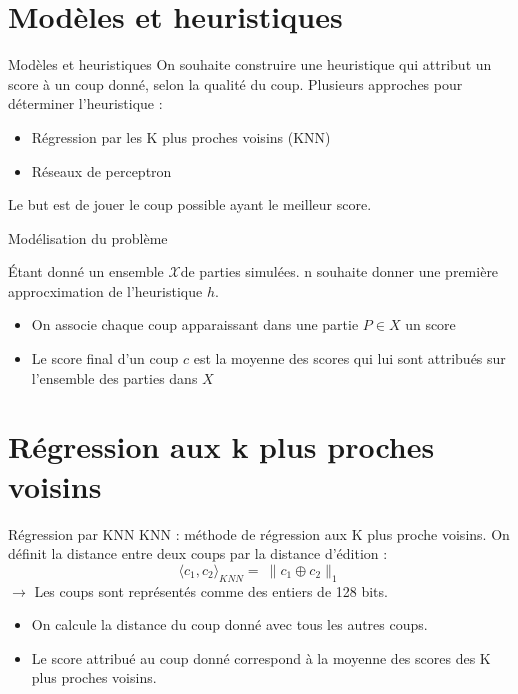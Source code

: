 \documentclass{beamer}
\begin{document}
{\section{Modèles et heuristiques}}
\begin{frame}{Modèles et heuristiques}
    On souhaite construire une heuristique qui attribut un \alert{score} à un coup donné, selon la \alert{qualité} du coup. 
    Plusieurs approches pour déterminer l'heuristique :
    \begin{itemize}
        \item Régression par les K plus proches voisins (KNN)
        \item Réseaux de perceptron
    \end{itemize}
    Le but est de jouer le coup possible ayant le meilleur score.
\end{frame}

\begin{frame}{Modélisation du problème}

    Étant donné un ensemble $\mathcal{X}$de parties simulées. 
    n souhaite donner une première approcximation de l'heuristique $h$.
    
    \begin{itemize}
        \item On associe chaque coup apparaissant dans une partie $P \in X$ un score
        \item Le score final d'un coup $c$ est la moyenne des scores qui lui sont attribués sur l'ensemble des parties dans $X$
    \end{itemize}

\end{frame}

{\section{Régression aux k plus proches voisins}}

\begin{frame}{Régression par KNN}
    KNN : méthode de régression aux \alert{K plus proche voisins}.
    On définit la distance entre deux coups par la \alert{distance d'édition} :
    $$ \langle c_1, c_2 \rangle_{KNN} = \ \rVert c_1 \oplus c_2 \lVert_1 $$
    $\rightarrow$ Les coups sont représentés comme des entiers de 128 bits. 
    \begin{itemize}
        \item On calcule la distance du coup donné avec tous les autres coups.
        \item Le score attribué au coup donné correspond à \alert{la moyenne des scores} des K plus proches voisins. 
    \end{itemize}

\end{frame}
\end{document}
